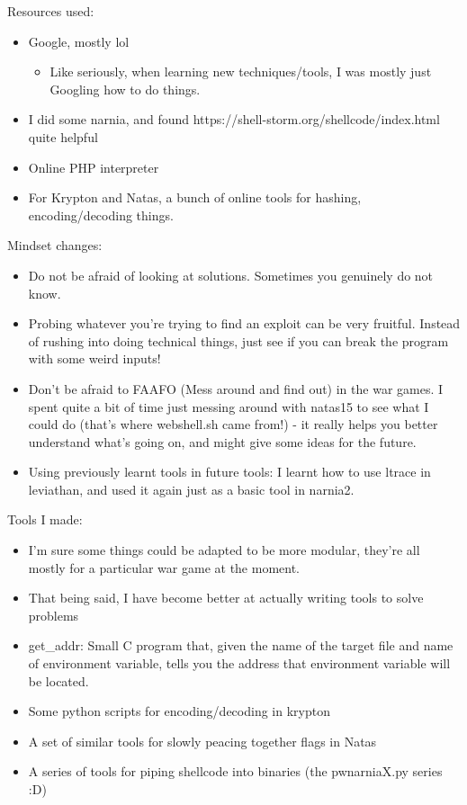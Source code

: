 \documentclass{article}
\begin{document}
Resources used:

\begin{itemize}
	\item Google, mostly lol
		\begin{itemize}
			\item Like seriously, when learning new techniques/tools, I was mostly just Googling how to do things.
		\end{itemize}
	\item I did some narnia, and found https://shell-storm.org/shellcode/index.html quite helpful
	\item Online PHP interpreter
	\item For Krypton and Natas, a bunch of online tools for hashing, encoding/decoding things.

\end{itemize}

Mindset changes:

\begin{itemize}

	\item Do not be afraid of looking at solutions. Sometimes you genuinely do not know.
	\item Probing whatever you're trying to find an exploit can be very fruitful. Instead of rushing into doing technical things, just see if you can break the program with some weird inputs!
	\item Don't be afraid to FAAFO (Mess around and find out) in the war games. I spent quite a bit of time just messing around with natas15 to see what I could do (that's where webshell.sh came from!) - it really helps you better understand what's going on, and might give some ideas for the future.
	\item Using previously learnt tools in future tools: I learnt how to use ltrace in leviathan, and used it again just as a basic tool in narnia2.

\end{itemize}

Tools I made:

\begin{itemize}
	\item I'm sure some things could be adapted to be more modular, they're all mostly for a particular war game at the moment.
	\item That being said, I have become better at actually writing tools to solve problems
	\item get\_addr: Small C program that, given the name of the target file and name of environment variable, tells you the address that environment variable will be located.
	\item Some python scripts for encoding/decoding in krypton
	\item A set of similar tools for slowly peacing together flags in Natas
	\item A series of tools for piping shellcode into binaries (the pwnarniaX.py series :D) 
\end{itemize}
\end{document}
